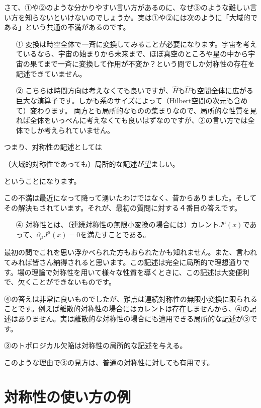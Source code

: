 \documentclass[report,paper=a4, fontsize=12pt, line_length=16cm, number_of_lines=33,dvipdfmx]{jlreq}
\numberwithin{equation}{chapter}
\newcommand{\del}{\partial}
\newcommand{\Hh}{\widehat{H}}
\newcommand{\Uh}{\widehat{U}}
\begin{document}
さて、①や②のような分かりやすい言い方があるのに、なぜ③のような難しい言い方を知らないといけないのでしょうか。実は①や②には次のように「大域的である」という共通の不満があるのです。
\begin{itemize}
  \item[①] 変換は時空全体で一斉に変換してみることが必要になります。宇宙を考えているなら、宇宙の始まりから未来まで、ほぼ真空のところや星の中から宇宙の果てまで一斉に変換して作用が不変か？という問でしか対称性の存在を記述できていません。
  \item[②] こちらは時間方向は考えなくても良いですが、$\Hh$も$\Uh$も空間全体に広がる巨大な演算子です。しかも系のサイズによって（Hilbert空間の次元も含めて）変わります。 両方とも局所的なものの集まりなので、局所的な性質を見れば全体をいっぺんに考えなくても良いはずなのですが、②の言い方では全体でしか考えられていません。
\end{itemize}
つまり、対称性の記述としては
\begin{emphasize}
  （大域的対称性であっても）局所的な記述が望ましい。
\end{emphasize}
ということになります。

この不満は最近になって降って湧いたわけではなく、昔からありました。そしてその解決もされています。それが、最初の質問に対する４番目の答えです。
\begin{itemize}
  \item[④] 対称性とは、（連続対称性の無限小変換の場合には）カレント$J^{\mu}(x)$であって、$\del_{\mu}J^{\mu}(x)=0$を満たすことである。
\end{itemize}
最初の問でこれを思い浮かべられた方もおられたかも知れません。また、言われてみれば皆さん納得されると思います。この記述は完全に局所的で理想通りです。場の理論で対称性を用いて様々な性質を導くときに、この記述は大変便利で、欠くことができないものです。

④の答えは非常に良いものでしたが、難点は連続対称性の無限小変換に限られることです。例えば離散的対称性の場合にはカレントは存在しませんから、④の記述はありません。実は離散的な対称性の場合にも適用できる局所的な記述が③です。
\begin{emphasize}
  ③のトポロジカル欠陥は対称性の局所的な記述を与える。  
\end{emphasize}
このような理由で③の見方は、普通の対称性に対しても有用です。

\section{対称性の使い方の例}
\end{document}
